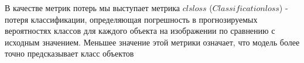 В качестве метрик потерь мы выступает метрика $cls loss$ ($Classification loss$) - потеря классификации, определяющая погрешность в прогнозируемых вероятностях классов для каждого объекта на изображении по сравнению с исходным значением. Меньшее значение этой метрики означает, что модель более точно предсказывает класс объектов